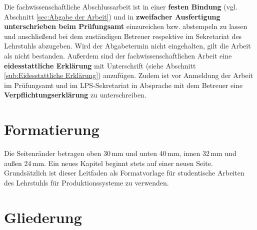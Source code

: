 Die fachwissenschaftliche Abschlussarbeit ist in einer \textbf{festen Bindung} (vgl. Abschnitt \ref{sec:Abgabe der Arbeit}) und in \textbf{zweifacher Ausfertigung unterschrieben beim Prüfungsamt} einzureichen bzw. abstempeln zu lassen und anschließend bei dem zuständigen Betreuer respektive im Sekretariat des Lehrstuhls abzugeben.
Wird der Abgabetermin nicht eingehalten, gilt die Arbeit als nicht bestanden.
Außerdem sind der fachwissenschaftlichen Arbeit eine \textbf{eidesstattliche Erklärung} mit Unterschrift (siehe Abschnitt \ref{sub:Eidesstattliche Erklärung}) anzufügen. Zudem ist vor Anmeldung der Arbeit im Prüfungsamt und im LPS-Sekretariat in Absprache mit dem Betreuer eine \textbf{Verpflichtungserklärung} zu unterschreiben.

\section{Formatierung}
\label{sec:Formatierung}

Die Seitenränder betragen oben 30\,mm und unten 40\,mm, innen 32\,mm und außen 24\,mm. Ein neues Kapitel beginnt stets auf einer neuen Seite.
Grundsätzlich ist dieser Leitfaden als Formatvorlage für studentische Arbeiten des Lehrstuhls für Produktionssysteme zu verwenden.


\section{Gliederung}
\label{sec:Gliederung}


